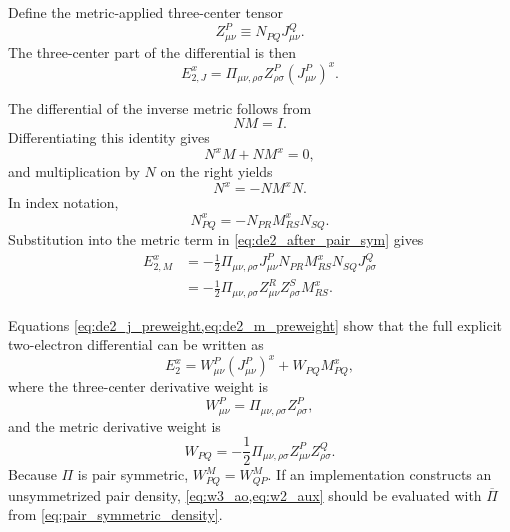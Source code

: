 \documentclass[aip,preprint]{revtex4-1}
\newcommand{\pert}{x}
\begin{document}
Define the metric-applied three-center tensor
\begin{equation}
Z^P_{\mu\nu}
\equiv
N_{PQ} J^Q_{\mu\nu}.
\label{eq:z_ao}
\end{equation}
The three-center part of the differential is then
\begin{equation}
E_{2,J}^{\pert}
=
\Pi_{\mu\nu,\rho\sigma}
Z^P_{\rho\sigma}
(J^P_{\mu\nu})^{\pert}.
\label{eq:de2_j_preweight}
\end{equation}

The differential of the inverse metric follows from
\begin{equation}
N M = I.
\end{equation}
Differentiating this identity gives
\begin{equation}
N^{\pert} M + N M^{\pert} = 0,
\end{equation}
and multiplication by $N$ on the right yields
\begin{equation}
N^{\pert} = -NM^{\pert}N.
\label{eq:dinv_metric}
\end{equation}
In index notation,
\begin{equation}
N^{\pert}_{PQ}
=
-N_{PR}M^{\pert}_{RS}N_{SQ}.
\end{equation}
Substitution into the metric term in \cref{eq:de2_after_pair_sym} gives
\begin{align}
E_{2,M}^{\pert}
&=
-\frac{1}{2}
\Pi_{\mu\nu,\rho\sigma}
J^P_{\mu\nu}
N_{PR}
M_{RS}^{\pert}
N_{SQ}
J^Q_{\rho\sigma}
\nonumber\\
&=
-\frac{1}{2}
\Pi_{\mu\nu,\rho\sigma}
Z^R_{\mu\nu}
Z^S_{\rho\sigma}
M_{RS}^{\pert}.
\label{eq:de2_m_preweight}
\end{align}

Equations \cref{eq:de2_j_preweight,eq:de2_m_preweight} show that the full
explicit two-electron differential can be written as
\begin{equation}
E_2^{\pert}
=
W^P_{\mu\nu} (J^P_{\mu\nu})^{\pert}
+
W_{PQ} M_{PQ}^{\pert},
\label{eq:de2_weight_form}
\end{equation}
where the three-center derivative weight is
\begin{equation}
W^P_{\mu\nu}
=
\Pi_{\mu\nu,\rho\sigma}
Z^P_{\rho\sigma},
\label{eq:w3_ao}
\end{equation}
and the metric derivative weight is
\begin{equation}
W_{PQ}
=
-\frac{1}{2}
\Pi_{\mu\nu,\rho\sigma}
Z^P_{\mu\nu}
Z^Q_{\rho\sigma}.
\label{eq:w2_aux}
\end{equation}
Because $\Pi$ is pair symmetric, $W^M_{PQ}=W^M_{QP}$.  If an implementation
constructs an unsymmetrized pair density, \cref{eq:w3_ao,eq:w2_aux} should be
evaluated with $\overline{\Pi}$ from \cref{eq:pair_symmetric_density}.
\end{document}
